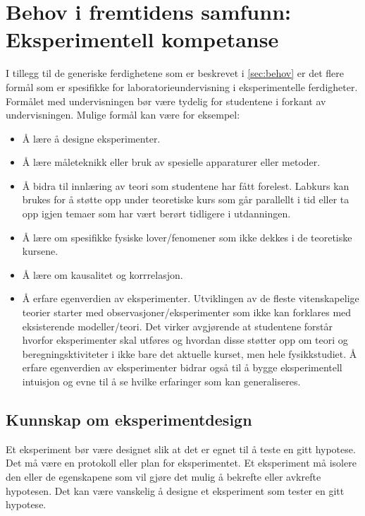\documentclass{article}
\begin{document}
\section{Behov i fremtidens samfunn: Eksperimentell kompetanse}
\label{sec:behov-exp}
I tillegg til de generiske ferdighetene som er beskrevet i \cref{sec:behov} er det flere formål som er spesifikke for laboratorieundervisning i eksperimentelle ferdigheter. Formålet med undervisningen bør være tydelig for studentene i forkant av undervisningen. Mulige formål kan være for eksempel:
\begin{itemize}
  \item Å lære å designe eksperimenter.
  \item Å lære måleteknikk eller bruk av spesielle apparaturer eller metoder.
  \item Å bidra til innlæring av teori som studentene har fått forelest. Labkurs kan brukes for å støtte opp under teoretiske kurs som går parallellt i tid eller ta opp igjen temaer som har vært berørt tidligere i utdanningen.
  \item Å lære om spesifikke fysiske lover/fenomener som
    ikke dekkes i de teoretiske kursene.
  \item Å lære om kausalitet og korrrelasjon.
  \item Å erfare egenverdien av eksperimenter. Utviklingen av de fleste vitenskapelige teorier starter med observasjoner/eksperimenter som ikke kan forklares med eksisterende modeller/teori.
    Det virker avgjørende at studentene forstår hvorfor eksperimenter skal utføres og hvordan disse støtter opp om teori og beregningsktiviteter i ikke bare det aktuelle kurset, men hele fysikkstudiet. Å erfare egenverdien av eksperimenter bidrar også til å bygge eksperimentell intuisjon og evne til å se hvilke erfaringer som kan generaliseres.
\end{itemize}

\subsection{Kunnskap om eksperimentdesign}
Et eksperiment bør være designet slik at det er egnet til å teste en gitt hypotese.
Det må være en protokoll eller plan for eksperimentet.
Et eksperiment må isolere den eller de egenskapene som vil gjøre det mulig å bekrefte eller avkrefte hypotesen.
Det kan være vanskelig å designe et eksperiment som tester en gitt hypotese.
\end{document}
